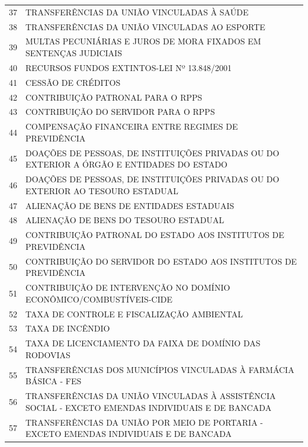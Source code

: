 \documentclass{article}
\begin{document}
\begin{longtable}[c]{m{1cm}|m{11cm}}
\multicolumn{1}{c|}{ 37 } & TRANSFERÊNCIAS DA UNIÃO VINCULADAS À SAÚDE \\
\multicolumn{1}{c|}{ 38 } & TRANSFERÊNCIAS DA UNIÃO VINCULADAS AO ESPORTE \\
\multicolumn{1}{c|}{ 39 } & MULTAS PECUNIÁRIAS E JUROS DE MORA FIXADOS EM SENTENÇAS JUDICIAIS \\
\multicolumn{1}{c|}{ 40 } & RECURSOS FUNDOS EXTINTOS-LEI Nº 13.848/2001 \\
\multicolumn{1}{c|}{ 41 } & CESSÃO DE CRÉDITOS \\
\multicolumn{1}{c|}{ 42 } & CONTRIBUIÇÃO PATRONAL PARA O RPPS \\
\multicolumn{1}{c|}{ 43 } & CONTRIBUIÇÃO DO SERVIDOR PARA O RPPS \\
\multicolumn{1}{c|}{ 44 } & COMPENSAÇÃO FINANCEIRA ENTRE REGIMES DE PREVIDÊNCIA \\
\multicolumn{1}{c|}{ 45 } & DOAÇÕES DE PESSOAS, DE INSTITUIÇÕES PRIVADAS OU DO EXTERIOR A ÓRGÃO E ENTIDADES DO ESTADO \\
\multicolumn{1}{c|}{ 46 } & DOAÇÕES DE PESSOAS, DE INSTITUIÇÕES PRIVADAS OU DO EXTERIOR AO TESOURO ESTADUAL \\
\multicolumn{1}{c|}{ 47 } & ALIENAÇÃO DE BENS DE ENTIDADES ESTADUAIS \\
\multicolumn{1}{c|}{ 48 } & ALIENAÇÃO DE BENS DO TESOURO ESTADUAL \\
\multicolumn{1}{c|}{ 49 } & CONTRIBUIÇÃO PATRONAL DO ESTADO AOS INSTITUTOS DE PREVIDÊNCIA \\
\multicolumn{1}{c|}{ 50 } & CONTRIBUIÇÃO DO SERVIDOR DO ESTADO AOS INSTITUTOS DE PREVIDÊNCIA \\
\multicolumn{1}{c|}{ 51 } & CONTRIBUIÇÃO DE INTERVENÇÃO NO DOMÍNIO ECONÔMICO/COMBUSTÍVEIS-CIDE \\
\multicolumn{1}{c|}{ 52 } & TAXA DE CONTROLE E FISCALIZAÇÃO AMBIENTAL \\
\multicolumn{1}{c|}{ 53 } & TAXA DE INCÊNDIO \\
\multicolumn{1}{c|}{ 54 } & TAXA DE LICENCIAMENTO DA FAIXA DE DOMÍNIO DAS RODOVIAS \\
\multicolumn{1}{c|}{ 55 } & TRANSFERÊNCIAS DOS MUNICÍPIOS VINCULADAS À FARMÁCIA BÁSICA - FES \\
\multicolumn{1}{c|}{ 56 } & TRANSFERÊNCIAS DA UNIÃO VINCULADAS À ASSISTÊNCIA SOCIAL - EXCETO EMENDAS INDIVIDUAIS E DE BANCADA \\
\multicolumn{1}{c|}{ 57 } & TRANSFERÊNCIAS DA UNIÃO POR MEIO DE PORTARIA - EXCETO EMENDAS INDIVIDUAIS E DE BANCADA \\

\end{longtable}
\end{document}
